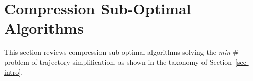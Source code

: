 
\section{Compression Sub-Optimal Algorithms}
\label{sec-subopt}



This section reviews compression sub-optimal algorithms solving the \emph{min-$\#$} problem of trajectory simplification, as shown in the taxonomy of Section~\ref{sec-intro}.









